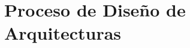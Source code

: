 ﻿\documentclass[handout,a4paper,slidestop,xcolor=pst,blue]{beamer}
\begin{document}

\section{Proceso de Diseño de Arquitecturas}

%
%
%

\end{document}
